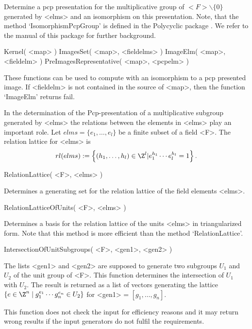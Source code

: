 Determine a pcp presentation for the multiplicative group of
$<F>\backslash\{0\}$ generated by
<elms> and an isomorphism on this presentation. 
Note, that the method `IsomorphismPcpGroup' is defined in the
Polycyclic package \cite{Polycyclic}. We refer to the manual of this
package for further background. 


\> Kernel( <map> )
\> ImagesSet( <map>, <fieldelms> ) 
\> ImageElm( <map>, <fieldelm> )
\> PreImagesRepresentative( <map>, <pcpelm> )

These functions can be used to compute with an isomorphism to a pcp
presented image. If <fieldelm> is not contained in the source of
<map>,
then the function `ImageElm' returns fail.

In the determination of the Pcp-presentation of a multiplicative
subgroup generated by <elms> the relations between the elements in
<elms> play an important role.
Let $elms=\{e_1,\dots,e_l\}$ be a finite subset of a field <F>.
The relation lattice for <elms> is 
$$
rl(elms):=\left\{(h_1,\dots,h_l) \in \Z^l | e_1^{h_1} \cdots
e_l^{h_l} = 1\right\} .
$$

\> RelationLattice( <F>, <elms> )

Determines a generating set 
for the relation lattice of the field elements <elms>.
 

\> RelationLatticeOfUnits( <F>, <elms> )

Determines a basis for the relation lattice of the units <elms> in 
triangularized form. Note that this method is more efficient than 
the method `RelationLattice'.

\> IntersectionOfUnitSubgroups( <F>, <gen1>, <gen2> )

The lists <gen1> and <gen2> are supposed to generate two subgroups 
$U_1$ and $U_2$ of the unit group of <F>. This function determines 
the intersection of $U_1$ with $U_2$. The result is returned as a 
list of vectors generating the lattice $\{ e \in \Z^n \mid g_1^{e_1} 
\cdots g_n^{e_n} \in U_2 \}$ for <gen1> = $[g_1, \ldots, g_n]$.

This function does not check the input for efficiency reasons and it 
may return wrong results if the input generators do not fulfil the 
requirements.



